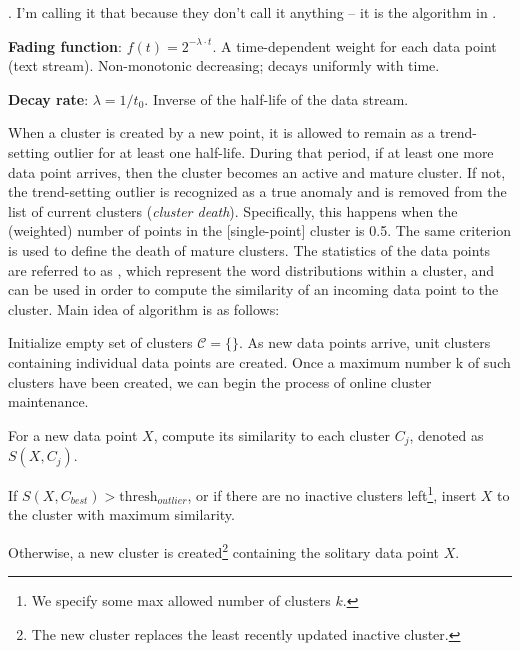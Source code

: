 \documentclass[11pt]{article}
\begin{document}
\myspace
\p {}. I'm calling it that because they don't call it anything -- it is the algorithm in . 
\begin{compactitem}
	\item \textbf{Fading function}: $f(t) = 2^{-\lambda \cdot t}$. A time-dependent weight for each data point (text stream). Non-monotonic decreasing; decays uniformly with time. 
	
	\item \textbf{Decay rate}: $\lambda = 1/t_0$. Inverse of the half-life of the data stream.
\end{compactitem}
When a cluster is created by a new point, it is allowed to remain as a trend-setting outlier for at least one half-life. During that period, if at least one more data point arrives, then the cluster becomes an active and mature cluster. If not, the trend-setting outlier is recognized as a true anomaly and is removed from the list of current clusters (\textit{cluster death}). Specifically, this happens when the (weighted) number of points in the [single-point] cluster is 0.5. The same criterion is used to define the death of
mature clusters. The statistics of the data points are referred to as , which represent the word distributions within a cluster, and can be used in order to compute the similarity of an incoming data point to the cluster. Main idea of algorithm is as follows:
\begin{compactenum}
	\item Initialize empty set of clusters $\mathcal{C} = \{\}$. As new data points arrive, unit clusters
	containing individual data points are created. Once a maximum number k of such clusters have been created, we can begin the process of online cluster maintenance.
	
	\item For a new data point $X$, compute its similarity to each cluster $C_j$, denoted as $S(X, C_j)$.
	\begin{compactitem}[-]
		\item If $S(X, C_{best}) > \text{thresh}_{outlier}$, or if there are no inactive clusters left\footnote{We specify some max allowed number of clusters $k$.},  insert $X$ to the cluster with maximum similarity.
		\item Otherwise, a new cluster is created\footnote{The new cluster replaces the least recently updated inactive cluster.} containing the solitary data point $X$.
	\end{compactitem} 
\end{compactenum}
\end{document}
